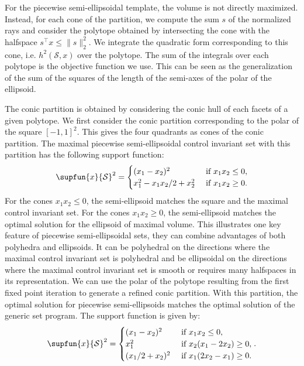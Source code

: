 \documentclass[11pt,twoside,a4paper,openright]{uclouvain-thesis}
\begin{document}
\begin{myexem}
  For the piecewise semi-ellipsoidal template,
  the volume is not directly maximized.
  Instead, for each cone of the partition,
  we compute the sum $s$ of the normalized rays and consider the polytope obtained by intersecting the cone with the halfspace
  $s^\top x \le \|s\|_2^2$.
  We integrate the quadratic form corresponding to this cone,
  i.e. $h^2(\mathcal{S}, x)$ over the polytope.
  The sum of the integrals over each polytope is the objective function we use.
  This can be seen as the generalization of the sum of the squares of the length of the semi-axes
  of the polar of the ellipsoid.

  The conic partition is obtained by considering the conic hull of each facets of a given polytope.
  We first consider the conic partition corresponding to the polar of the square $[-1, 1]^2$.
  This gives the four quadrants as cones of the conic partition.
  The maximal piecewise semi-ellipsoidal control invariant set with this partition has the following support function:
  $$
  \supfun{x}{\mathcal{S}}^2 = \begin{cases}
  (x_1 - x_2)^2 & \text{ if }x_1x_2 \le 0,\\
  x_1^2 - x_1x_2/2 + x_2^2 & \text{ if }x_1x_2 \ge 0.
  \end{cases}
  $$
  For the cones $x_1x_2 \le 0$, the semi-ellipsoid matches the square and the maximal control invariant set.
  For the cones $x_1x_2 \ge 0$, the semi-ellipsoid matches the optimal solution for the ellipsoid of maximal volume.
  This illustrates one key feature of piecewise semi-ellipsoidal sets, they can combine advantages of both polyhedra and ellipsoids.
  It can be polyhedral on the directions where the maximal control invariant set is polyhedral and be ellipsoidal on the directions where the maximal control invariant set is smooth or requires many halfspaces in its representation.
  We can use the polar of the polytope resulting from the first fixed point iteration to generate a refined conic partition.
  With this partition, the optimal solution for piecewise semi-ellipsoids matches the optimal solution of the generic set program. The support function is given by:
  $$
  \supfun{x}{\mathcal{S}}^2 = \begin{cases}
  (x_1 - x_2)^2 & \text{ if }x_1x_2 \le 0,\\
  x_1^2 & \text{ if }x_2(x_1-2x_2) \ge 0,\\
  (x_1/2 + x_2)^2 & \text{ if }x_1(2x_2-x_1) \ge 0.\\
  \end{cases}.
  $$


\end{myexem}
\end{document}
